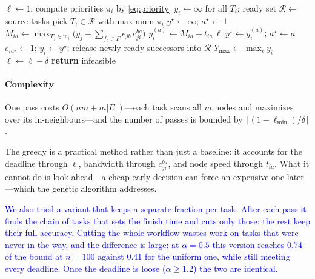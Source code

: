 \documentclass[conference]{IEEEtran}
\newcommand{\rev}[1]{\textcolor{blue}{#1}}%
\begin{document}
\begin{algorithm}[t]
\caption{Bandwidth/Data-Aware Greedy DAG Scheduler}
\label{alg:greedy}
\begin{algorithmic}[1]
\STATE $\ell\leftarrow 1$; compute priorities $\pi_i$ by \eqref{eq:priority}
\REPEAT
  \STATE $y_i\leftarrow\infty$ for all $T_i$; ready set $\mathcal{R}\leftarrow$ source tasks
    \STATE pick $T_i\in\mathcal{R}$ with maximum $\pi_i$
    \STATE $y^{\star}\leftarrow\infty$; $a^{\star}\leftarrow\bot$
        \STATE $M_{ia}\leftarrow \max_{T_j\in \mathrm{in}_i}\bigl(y_j+\sum_{f_b\in F} e_{jb}\, c_{ji}^{ba}\bigr)$
        \STATE $y_i^{(a)}\leftarrow M_{ia}+t_{ia}\,\ell$
            \STATE $y^{\star}\leftarrow y_i^{(a)}$; $a^{\star}\leftarrow a$
        \ENDIF
    \ENDFOR
    \STATE $e_{ia^{\star}}\leftarrow 1$; $y_i\leftarrow y^{\star}$; release newly-ready successors into $\mathcal{R}$
  \ENDWHILE
  \STATE $Y_{\max}\leftarrow \max_i y_i$
      \STATE $\ell\leftarrow\ell-\delta$ 
  \ENDIF
{}
    \STATE \textbf{return} infeasible 
\ENDIF
\end{algorithmic}
\end{algorithm}

\paragraph*{Complexity} One pass costs $O(nm+m|E|)$---each task scans all $m$ nodes and maximizes over its in-neighbours---and the number of passes is bounded by $\lceil(1-\ell_{\min})/\delta\rceil$.

The greedy is a practical method rather than just a baseline: it accounts for the deadline through $\ell$, bandwidth through $c_{ji}^{ba}$, and node speed through $t_{ia}$. What it cannot do is look ahead---a cheap early decision can force an expensive one later---which the genetic algorithm addresses.

\rev{We also tried a variant that keeps a separate fraction per task. After each pass it finds the chain of tasks that sets the finish time and cuts only those; the rest keep their full accuracy. Cutting the whole workflow wastes work on tasks that were never in the way, and the difference is large: at $\alpha{=}0.5$ this version reaches 0.74 of the bound at $n{=}100$ against 0.41 for the uniform one, while still meeting every deadline. Once the deadline is loose ($\alpha\ge1.2$) the two are identical.}
\end{document}
